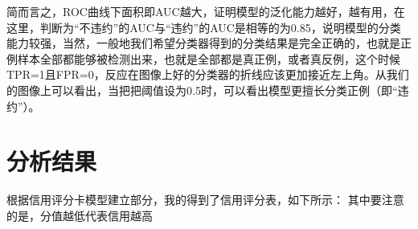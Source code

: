 \documentclass[12pt]{article}
\begin{document}
\begin{flushleft}
	\noindent\qquad 简而言之，ROC曲线下面积即AUC越大，证明模型的泛化能力越好，越有用，在这里，判断为“不违约”的AUC与“违约”的AUC是相等的为0.85，说明模型的分类能力较强，当然，一般地我们希望分类器得到的分类结果是完全正确的，也就是正例样本全部都能够被检测出来，也就是全部都是真正例，或者真反例，这个时候TPR=1且FPR=0，反应在图像上好的分类器的折线应该更加接近左上角。从我们的图像上可以看出，当把把阈值设为0.5时，可以看出模型更擅长分类正例（即“违约”）。
\end{flushleft}
\newpage
\section{分析结果}
\begin{flushleft}
	\noindent\qquad 根据信用评分卡模型建立部分，我的得到了信用评分表，如下所示：
	其中要注意的是，分值越低代表信用越高
\end{flushleft}
\end{document}
